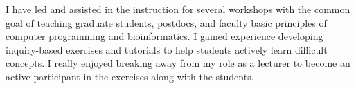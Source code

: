 


I have led and assisted in the instruction for several workshops with the
common goal of teaching graduate students, postdocs, and faculty basic
principles of computer programming and bioinformatics.
I gained experience developing inquiry-based exercises and tutorials
to help students actively learn difficult concepts.
I really enjoyed breaking away from my role as a lecturer to become an active
participant in the exercises along with the students.


